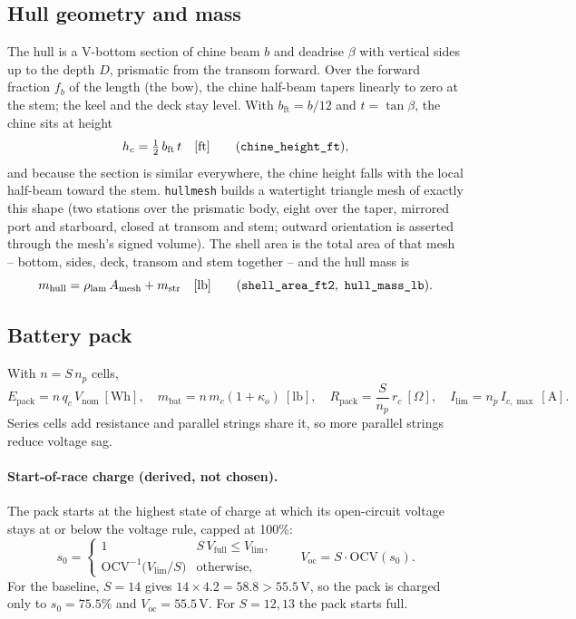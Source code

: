\documentclass[11pt,a4paper]{article}
\renewcommand{\_}{\textunderscore\allowbreak}
\newcommand{\code}[1]{\texttt{#1}}
\newcommand{\Epack}{E_{\mathrm{pack}}}
\newcommand{\Voc}{V_{\mathrm{oc}}}
\newcommand{\Rpack}{R_{\mathrm{pack}}}
\begin{document}
\subsection{Hull geometry and mass}
The hull is a V-bottom section of chine beam $b$ and deadrise $\beta$ with vertical sides up to the depth $D$,
prismatic from the transom forward. Over the forward fraction $f_b$ of the length (the bow), the chine half-beam
tapers linearly to zero at the stem; the keel and the deck stay level. With $b_{\mathrm{ft}}=b/12$ and $t=\tan\beta$,
the chine sits at height
\begin{equation}
  h_c = \tfrac12\, b_{\mathrm{ft}}\, t \quad[\mathrm{ft}] \qquad (\code{chine\_height\_ft}),
  \label{eq:chine}
\end{equation}
and because the section is similar everywhere, the chine height falls with the local half-beam toward the stem.
\code{hull\_mesh} builds a watertight triangle mesh of exactly this shape (two stations over the prismatic body,
eight over the taper, mirrored port and starboard, closed at transom and stem; outward orientation is asserted
through the mesh's signed volume). The shell area is the total area of that mesh -- bottom, sides, deck, transom
and stem together -- and the hull mass is
\begin{equation}
  m_{\mathrm{hull}} = \rho_{\mathrm{lam}}\,A_{\mathrm{mesh}} + m_{\mathrm{str}} \quad[\mathrm{lb}]
  \qquad (\code{shell\_area\_ft2},\ \code{hull\_mass\_lb}).
  \label{eq:hull}
\end{equation}

\subsection{Battery pack}
With $n = S\,n_p$ cells,
\begin{equation}
  \Epack = n\,q_c\,V_{\mathrm{nom}}\ [\mathrm{Wh}], \quad
  m_{\mathrm{bat}} = n\,m_c(1+\kappa_o)\ [\mathrm{lb}], \quad
  \Rpack = \frac{S}{n_p}\,r_c\ [\Omega], \quad
  I_{\lim} = n_p\,I_{c,\max}\ [\mathrm A].
  \label{eq:pack}
\end{equation}
Series cells add resistance and parallel strings share it, so more parallel strings reduce voltage sag.

\paragraph{Start-of-race charge (derived, not chosen).}
The pack starts at the highest state of charge at which its open-circuit voltage stays at or below the voltage rule, capped at 100\%:
\begin{equation}
  s_0 =
  \begin{cases}
    1 & S\,V_{\mathrm{full}} \le V_{\lim},\\[2pt]
    \mathrm{OCV}^{-1}\!\bigl(V_{\lim}/S\bigr) & \text{otherwise},
  \end{cases}
  \qquad
  \Voc = S\cdot\mathrm{OCV}(s_0).
  \label{eq:soc0}
\end{equation}
For the baseline, $S=14$ gives $14\times4.2=58.8>55.5\,\mathrm V$, so the pack is charged only to $s_0=75.5\%$ and $\Voc=55.5\,\mathrm V$.
For $S=12,13$ the pack starts full.
\end{document}
